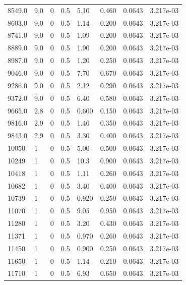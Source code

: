 \documentclass[preview]{standalone}
\begin{document}
{{{{{\begin{tabular}{L{1.2cm}C{1.2cm} C{0.3cm}C{0.5cm} C{1.4cm}C{1.4cm} C{1.4cm}C{1.4cm}}
  8549.0  &   9.0  & 0     & 0.5 &  5.10  & 0.460  & 0.0643 &  3.217e-03   \\ 
  8603.0  &   9.0  & 0     & 0.5 &  1.14  & 0.200  & 0.0643 &  3.217e-03   \\ 
  8741.0  &   9.0  & 0     & 0.5 &  1.09  & 0.200  & 0.0643 &  3.217e-03   \\ 
  8889.0  &   9.0  & 0     & 0.5 &  1.90  & 0.200  & 0.0643 &  3.217e-03   \\ 
  8987.0  &   9.0  & 0     & 0.5 &  1.20  & 0.250  & 0.0643 &  3.217e-03   \\ 
  9046.0  &   9.0  & 0     & 0.5 &  7.70  & 0.670  & 0.0643 &  3.217e-03   \\ 
  9286.0  &   9.0  & 0     & 0.5 &  2.12  & 0.290  & 0.0643 &  3.217e-03   \\ 
  9372.0  &   9.0  & 0     & 0.5 &  6.40  & 0.580  & 0.0643 &  3.217e-03   \\ 
  9665.0  &   2.8  & 0     & 0.5 &  0.600  & 0.150  & 0.0643 &  3.217e-03   \\ 
  9816.0  &   2.9  & 0     & 0.5 &  1.46  & 0.350  & 0.0643 &  3.217e-03   \\ 
  9843.0  &   2.9  & 0     & 0.5 &  3.30  & 0.400  & 0.0643 &  3.217e-03   \\ 
  10050  &     1  & 0     & 0.5 &  5.00  & 0.500  & 0.0643 &  3.217e-03   \\ 
  10249  &     1  & 0     & 0.5 &  10.3  & 0.900  & 0.0643 &  3.217e-03   \\ 
  10418  &     1  & 0     & 0.5 &  1.11  & 0.260  & 0.0643 &  3.217e-03   \\ 
  10682  &     1  & 0     & 0.5 &  3.40  & 0.400  & 0.0643 &  3.217e-03   \\ 
  10739  &     1  & 0     & 0.5 &  0.920  & 0.250  & 0.0643 &  3.217e-03   \\ 
  11070  &     1  & 0     & 0.5 &  9.05  & 0.950  & 0.0643 &  3.217e-03   \\ 
  11280  &     1  & 0     & 0.5 &  3.20  & 0.430  & 0.0643 &  3.217e-03   \\ 
  11371  &     1  & 0     & 0.5 &  0.970  & 0.260  & 0.0643 &  3.217e-03   \\ 
  11450  &     1  & 0     & 0.5 &  0.900  & 0.250  & 0.0643 &  3.217e-03   \\ 
  11650  &     1  & 0     & 0.5 &  1.14  & 0.210  & 0.0643 &  3.217e-03   \\ 
  11710  &     1  & 0     & 0.5 &  6.93  & 0.650  & 0.0643 &  3.217e-03   \\ 

\end{tabular}}}}}}
\end{document}
